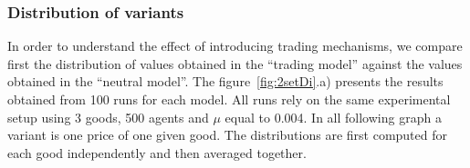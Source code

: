 \documentclass[a4paper]{article}
\begin{document}
%
%
%


\subsubsection{Distribution of variants}

In order to understand the effect of introducing trading mechanisms, we compare first the distribution of values obtained in the ``trading model'' against the values obtained in the ``neutral model''. The figure~\ref{fig:2setDi}.a) presents the results obtained from 100 runs for each model. All runs rely on the same experimental setup using 3 goods, 500 agents and $\mu$ equal to 0.004. In all following graph  a variant is one price of one given good. The distributions are first computed for each good independently and then averaged together.
\end{document}
